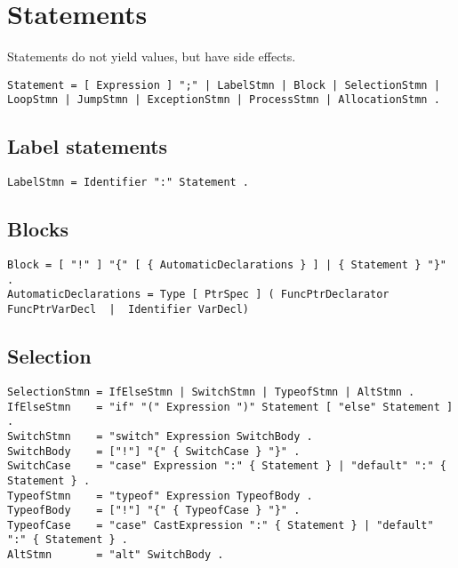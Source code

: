 
\hypertarget{statements}{%
\chapter{Statements}\label{statements}}

Statements do not yield values, but have side effects.

\begin{lstlisting}
Statement = [ Expression ] ";" | LabelStmn | Block | SelectionStmn | LoopStmn | JumpStmn | ExceptionStmn | ProcessStmn | AllocationStmn . 
\end{lstlisting}

\hypertarget{label-statements}{%
\section{Label statements}\label{label-statements}}

\begin{lstlisting}
LabelStmn = Identifier ":" Statement . 
\end{lstlisting}

\hypertarget{blocks}{%
\section{Blocks}\label{blocks}}

\begin{lstlisting}
Block = [ "!" ] "{" [ { AutomaticDeclarations } ] | { Statement } "}" .
AutomaticDeclarations = Type [ PtrSpec ] ( FuncPtrDeclarator FuncPtrVarDecl  |  Identifier VarDecl) 
\end{lstlisting}

\hypertarget{selection}{%
\section{Selection}\label{selection}}

\begin{lstlisting}
SelectionStmn = IfElseStmn | SwitchStmn | TypeofStmn | AltStmn .
IfElseStmn    = "if" "(" Expression ")" Statement [ "else" Statement ] .
SwitchStmn    = "switch" Expression SwitchBody .
SwitchBody    = ["!"] "{" { SwitchCase } "}" .
SwitchCase    = "case" Expression ":" { Statement } | "default" ":" { Statement } .
TypeofStmn    = "typeof" Expression TypeofBody .
TypeofBody    = ["!"] "{" { TypeofCase } "}" .
TypeofCase    = "case" CastExpression ":" { Statement } | "default" ":" { Statement } .
AltStmn       = "alt" SwitchBody .
\end{lstlisting}

